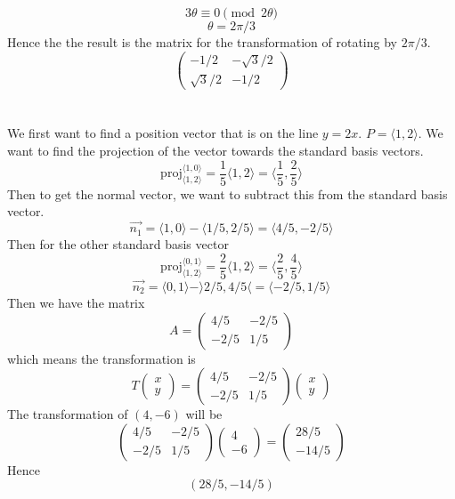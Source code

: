 \documentclass{article}
\begin{document}
\[3\theta \equiv 0 \pmod{2\theta}\]
\[\theta = 2\pi/3\]
Hence the the result is the matrix for the transformation of rotating by \(2\pi/3\). 
\[\begin{pmatrix}
    -1/2&-\sqrt{3}/2 \\ \sqrt{3}/2&-1/2
\end{pmatrix}\]

\section{}
We first want to find a position vector that is on the line \(y = 2x\). \(P = \langle 1,2 \rangle\). We want to find the projection of the vector towards the standard basis vectors. 
\[\text{proj}_{\langle  1,2 \rangle}^{\langle 1,0 \rangle} = \frac{1}{5}\langle 1,2 \rangle = \langle \frac{1}{5}, \frac{2}{5} \rangle\]
Then to get the normal vector, we want to subtract this from the standard basis vector. 
\[\vec{n_1} = \langle 1,0\rangle - \langle 1/5, 2/5 \rangle = \langle  4/5, -2/5\rangle\]
Then for the other standard basis vector
\[\text{proj}_{\langle 1,2 \rangle}^{\langle 0,1 \rangle} = \frac{2}{5}\langle 1,2 \rangle = \langle \frac{2}{5}, \frac{4}{5} \rangle \]
\[\vec{n_2} = \langle 0,1 \rangle - \rangle 2/5, 4/5\langle = \langle -2/5, 1/5 \rangle  \]
Then we have the matrix 
\[A = \begin{pmatrix}
    4/5&-2/5 \\ -2/5&1/5
\end{pmatrix}\]
which means the transformation is 
\[T\begin{pmatrix}
    x \\ y
\end{pmatrix} = \begin{pmatrix}
    4/5&-2/5 \\ -2/5&1/5
\end{pmatrix}\begin{pmatrix}
    x \\ y
\end{pmatrix}\]
The transformation of \((4,-6)\) will be 
\[\begin{pmatrix}
    4/5&-2/5 \\ -2/5&1/5
\end{pmatrix}\begin{pmatrix}
    4 \\ -6
\end{pmatrix} = \begin{pmatrix}
    28/5 \\ -14/5
\end{pmatrix}\]
Hence 
\[(28/5,-14/5)\]
\end{document}
